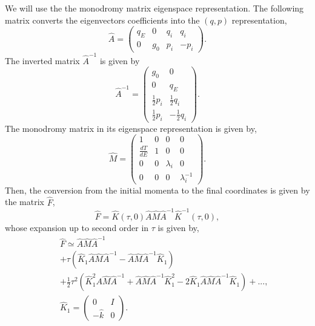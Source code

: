 \documentclass[journal=jpcafh,manuscript=article]{achemso}
\begin{document}
We will use the the monodromy matrix eigenspace representation. The
following matrix converts the eigenvectors coefficients into the
$(q,p)$ representation,
\begin{equation}
  \label{b7}
  \hat{A}=\left(\begin{array}{cccc}q_E&0&q_i&q_i\\0&g_0&p_i&-p_i\end{array}\right).
\end{equation}
The inverted matrix $\hat{A}^{-1}$ is given by
\begin{equation}
  \label{b8}
  \hat{A}^{-1}=\left(\begin{array}{cc}g_0&0\\0&q_E\\\frac{1}{2}p_i&\frac{1}{2}q_i\\\frac{1}{2}p_i&-\frac{1}{2}q_i\end{array}\right).
\end{equation}
The monodromy matrix in its eigenspace representation is given by,
\begin{equation}
  \label{b9}
  \hat{M}=\left(\begin{array}{cccc}1&0&0&0\\\frac{dT}{dE}&1&0&0\\0&0&\lambda_i&0\\0&0&0&\lambda_i^{-1}\end{array}\right).
\end{equation}
Then, the conversion from the initial momenta to the final coordinates
is given by the matrix $\hat{F}$,
\begin{equation}
  \label{b10}
  \hat{F}=\hat{K}(\tau,0)\hat{A}\hat{M}\hat{A}^{-1}\hat{K}^{-1}(\tau,0),
\end{equation}
whose expansion up to second order in $\tau$ is given by,
\begin{eqnarray}
  \label{b11}
  &&\hat{F}\simeq\hat{A}\hat{M}\hat{A}^{-1}
  \\
  \nonumber
  &&+\tau(\hat{K}_1\hat{A}\hat{M}\hat{A}^{-1}-\hat{A}\hat{M}\hat{A}^{-1}\hat{K}_1)
  \\
  \nonumber
  &&+ \frac{1}{2}\tau^2(\hat{K}_1^2A\hat{M}\hat{A}^{-1}+\hat{A}\hat{M}\hat{A}^{-1}\hat{K}_1^2-
     2 \hat{K}_1\hat{A}\hat{M}\hat{A}^{-1}\hat{K}_1)+...,
  \\
  \label{b12}
  &&\hat{K}_1=\left(\begin{array}{cc}0&I\\-\hat{k}&0\end{array}\right).
\end{eqnarray}
\end{document}
